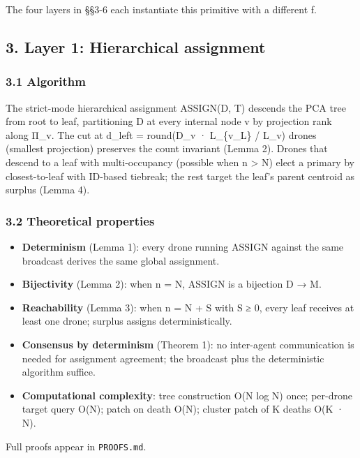 The four layers in §§3-6 each instantiate this primitive with a
different f.

\subsection{3. Layer 1: Hierarchical
assignment}\label{layer-1-hierarchical-assignment}

\subsubsection{3.1 Algorithm}\label{algorithm}

The strict-mode hierarchical assignment ASSIGN(D, T) descends the PCA
tree from root to leaf, partitioning D at every internal node v by
projection rank along Π\_v. The cut at d\_left =
round(\textbar D\_v\textbar{} · \textbar L\_\{v\_L\}\textbar{} /
\textbar L\_v\textbar) drones (smallest projection) preserves the count
invariant (Lemma 2). Drones that descend to a leaf with multi-occupancy
(possible when n \textgreater{} N) elect a primary by closest-to-leaf
with ID-based tiebreak; the rest target the leaf's parent centroid as
surplus (Lemma 4).

\subsubsection{3.2 Theoretical properties}\label{theoretical-properties}

\begin{itemize}
\tightlist
\item
  \textbf{Determinism} (Lemma 1): every drone running ASSIGN against the
  same broadcast derives the same global assignment.
\item
  \textbf{Bijectivity} (Lemma 2): when n = N, ASSIGN is a bijection D →
  M.
\item
  \textbf{Reachability} (Lemma 3): when n = N + S with S ≥ 0, every leaf
  receives at least one drone; surplus assigns deterministically.
\item
  \textbf{Consensus by determinism} (Theorem 1): no inter-agent
  communication is needed for assignment agreement; the broadcast plus
  the deterministic algorithm suffice.
\item
  \textbf{Computational complexity}: tree construction O(N log N) once;
  per-drone target query O(N); patch on death O(N); cluster patch of K
  deaths O(K · N).
\end{itemize}

Full proofs appear in \texttt{PROOFS.md}.

